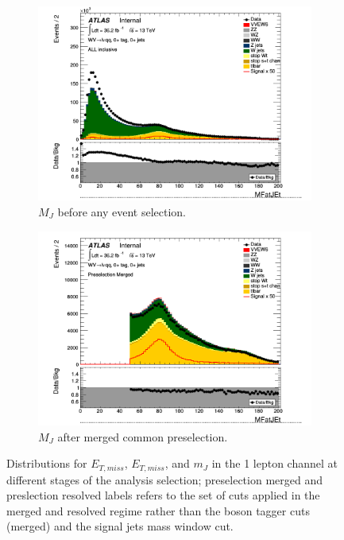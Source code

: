 \begin{figure}[ht]
        \begin{subfigure}{0.3\textwidth}
            \includegraphics[width=\linewidth]{figures/1lep/CRPlots/C_0ptag0pjet_0ptv_ALL_MFatJet_Lin.png}
            \caption{$M_{J}$ before any event selection.}
        \end{subfigure}
        \begin{subfigure}{0.3\textwidth}
            \includegraphics[width=\linewidth]{figures/1lep/CRPlots/C_0ptag0pjet_0ptv_Presel_Merged_MFatJet_Lin.png}
            \caption{$M_{J}$ after merged common preselection.}
        \end{subfigure}

        \caption{Distributions for $E_{T,miss}$, $E_{T,miss}$, and $m_{J}$ in the 1 lepton channel at different stages of the analysis selection; preselection merged and preslection resolved labels refers to the set of cuts applied in the merged and resolved regime rather than the boson tagger cuts (merged) and the signal jets mass window cut.}
        \label{fig:1LepPreselCuts}
\end{figure}


